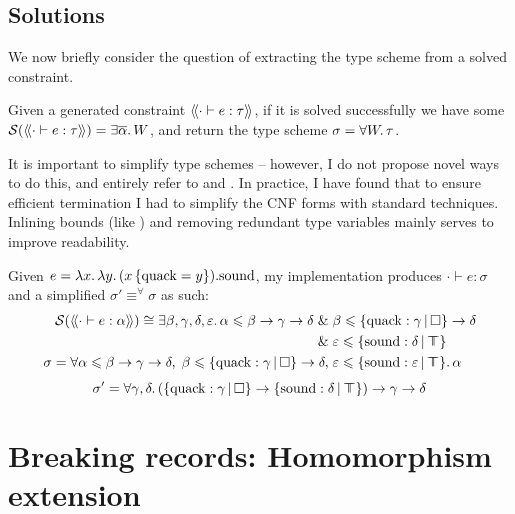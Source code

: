 \subsection{Solutions}
\label{subsec:simplification}

We now briefly consider the question of extracting the type scheme from a solved constraint. 

Given a generated constraint $\cstr{\cdot}{e}{\tau}$, if it is solved successfully we have some $\mathcal S \left( \cstr{\cdot}{e}{\tau} \right) = \exists \overline{\alpha} \ldotp \sbnd$, and return the type scheme $\sigma =  \forall W \ldotp \tau$.

It is important to simplify type schemes -- however, I do not propose novel ways to do this, and entirely refer to \textcite{simple-sub} and \textcite{mlstruct}. In practice, I have found that to ensure efficient termination I had to simplify the CNF forms with standard techniques. Inlining bounds (like \textcite{dolan-thesis}) and removing redundant type variables mainly serves to improve readability.

\begin{example}
    Given
    $e = \lambda {x} \ldotp \lambda {y} \ldotp {(x \, \{ \mathrm{quack} = y \})}{.}{\mathrm{sound}}$,
    my implementation produces $\cdot \vdash e : \sigma$ and a simplified $\sigma' \equiv^\forall \sigma$ as such:
    \begin{align*}
    \mathcal S(\cstr{\cdot}{e}{\alpha}) \cong \exists \beta, \gamma, \delta, \varepsilon \ldotp \alpha \sub \beta \to \gamma \to \delta \und& \beta \sub \flext{\mathrm{quack}: \gamma}{\flabsent} \to \delta \\ \und& \varepsilon \sub \flext{\mathrm{sound}: \delta}{\flftop} \\
    \sigma = \forall \alpha \sub \beta \to \gamma \to \delta,\; \beta \sub \flext{\mathrm{quack}: \gamma}{\flabsent} \to \delta,\;& \varepsilon \sub \flext{\mathrm{sound}: \varepsilon}{\flftop} \ldotp \alpha
    \end{align*}    
    $$ \sigma' = \forall \gamma, \delta \ldotp (\flext{\mathrm{quack}: \gamma}{\flabsent} \to \flext{\mathrm{sound} : \delta}{\flftop}) \to \gamma \to \delta $$
\end{example}

\section{Breaking records: Homomorphism extension}
\label{sec:morphisms}

